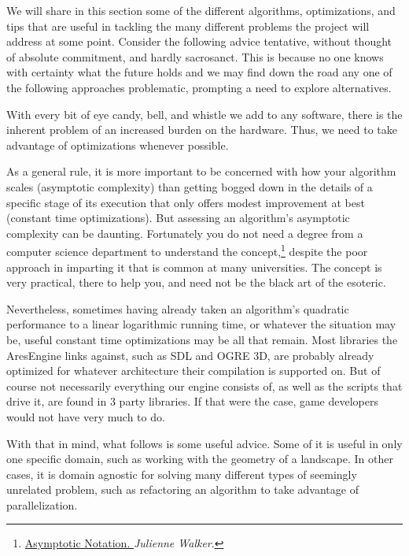 
We will share in this section some of the different algorithms, optimizations, and tips that are useful in tackling the many different problems the project will address at some point. Consider the following advice tentative, without thought of absolute commitment, and hardly sacrosanct. This is because no one knows with certainty what the future holds and we may find down the road any one of the following approaches problematic, prompting a need to explore alternatives. 

With every bit of eye candy, bell, and whistle we add to any software, there is the inherent problem of an increased burden on the hardware. Thus, we need to take advantage of optimizations whenever possible. 

As a general rule, it is more important to be concerned with how your algorithm scales (asymptotic complexity) than getting bogged down in the details of a specific stage of its execution that only offers modest improvement at best (constant time optimizations). But assessing an algorithm's asymptotic complexity can be daunting. Fortunately you do not need a degree from a computer science department to understand the concept,\footnote{\href{http://www.eternallyconfuzzled.com/arts/jsw_art_bigo.aspx}{Asymptotic Notation. }{\it Julienne Walker}.} despite the poor approach in imparting it that is common at many universities. The concept is very practical, there to help you, and need not be the black art of the esoteric.

Nevertheless, sometimes having already taken an algorithm's quadratic performance to a linear logarithmic running time, or whatever the situation may be, useful constant time optimizations may be all that remain. Most libraries the AresEngine links against, such as SDL and OGRE 3D, are probably already optimized for whatever architecture their compilation is supported on. But of course not necessarily everything our engine consists of, as well as the scripts that drive it, are found in 3 party libraries. If that were the case, game developers would not have very much to do.

With that in mind, what follows is some useful advice. Some of it is useful in only one specific domain, such as working with the geometry of a landscape. In other cases, it is domain agnostic for solving many different types of seemingly unrelated problem, such as refactoring an algorithm to take advantage of parallelization.

